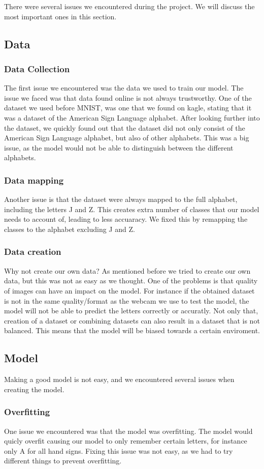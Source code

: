 \documentclass[../paper.tex]{subfiles}
\begin{document}
There were several issues we encountered during the project. 
We will discuss the most important ones in this section.
\subsection{Data}
\subsubsection{Data Collection}
The first issue we encountered was the data we used to train our model.
The issue we faced was that data found online is not always trustworthy.
One of the dataset we used before MNIST, was one that we found on kagle, stating that it was a dataset of the American Sign Language alphabet.
After looking further into the dataset, we quickly found out that the dataset did not only consist of the American Sign Language alphabet, but also of other alphabets.
This was a big issue, as the model would not be able to distinguish between the different alphabets.
\subsubsection{Data mapping}
Another issue is that the dataset were always mapped to the full alphabet, including the letters J and Z.
This creates extra number of classes that our model needs to account of, leading to less accuaracy.
We fixed this by remapping the classes to the alphabet excluding J and Z.
\subsubsection{Data creation}
Why not create our own data? As mentioned before we tried to create our own data, but this was not as easy as we thought.
One of the problems is that quality of images can have an impact on the model. 
For instance if the obtained dataset is not in the same quality/format as the webcam we use to test the model, the model will not be able to predict the letters correctly or accuratly.
Not only that, creation of a dataset or combining datasets can also result in a dataset that is not balanced.
This means that the model will be biased towards a certain enviroment.
\subsection{Model}
Making a good model is not easy, and we encountered several issues when creating the model.
\subsubsection{Overfitting}
One issue we encountered was that the model was overfitting. 
The model would quicly overfit causing our model to only remember certain letters, for instance only A for all hand signs.
Fixing this issue was not easy, as we had to try different things to prevent overfitting.
\end{document}
